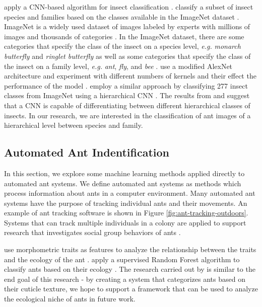 \documentclass[12pt]{article}
\begin{document}
\citeauthor*{lim_performance_2017} apply a CNN-based algorithm for insect
classification \cite{lim_performance_2017}. \citeauthor*{lim_performance_2017}
classify a subset of insect species and families based on the classes available
in the ImageNet dataset \cite{deng_imagenet_2009}. ImageNet is a widely used
dataset of images labeled by experts with millions of images and thousands of
categories \cite{deng_imagenet_2009}. In the ImageNet dataset, there are some
categories that specify the class of the insect on a species level,
\textit{e.g.} \textit{monarch butterfly} and \textit{ringlet butterfly} as well
as some categories that specify the class of the insect on a family level,
\textit{e.g.} \textit{ant}, \textit{fly}, and \textit{bee}
\cite{imagenet_labels}. \citeauthor*{lim_performance_2017} use a modified
AlexNet architecture and experiment with different numbers of kernels and their
effect the performance of the model \cite{lim_performance_2017}.
\citeauthor*{glick_insect_2016} employ a similar approach by classifying 277
insect classes from ImageNet using a hierarchical CNN \cite{glick_insect_2016}.
The results from \citeauthor*{lim_performance_2017} and
\citeauthor*{glick_insect_2016} suggest that a CNN is capable of differentiating
between different hierarchical classes of insects. In our research, we are
interested in the classification of ant images of a hierarchical level between
species and family.

\subsection{Automated Ant Indentification}

In this section, we explore some machine learning methods applied directly to
automated ant systems. We define automated ant systems as methods which process
information about ants in a computer environment. Many automated ant systems
have the purpose of tracking individual ants and their movements. An example of
ant tracking software is shown in Figure \ref{fig:ant-tracking-outdoors}.
Systems that can track multiple individuals in a colony are applied to support
research that investigates social group behaviors of ants
\cite{chandra_foraging_2021, fetter_oxytocin_2021, sclocco_integrating_2020}.

\citeauthor*{sosiak_multidimensional_2021} use morphometric traits as features to
analyze the relationship between the traits and the ecology of the ant
\cite{sosiak_multidimensional_2021}. \citeauthor*{sosiak_multidimensional_2021}
apply a supervised Random Forest algorithm to classify ants based on their
ecology \cite{sosiak_multidimensional_2021}. The research carried out by
\citeauthor*{sosiak_multidimensional_2021} is similar to the end goal of this
research - by creating a system that categorizes ants based on their cuticle
texture, we hope to support a framework that can be used to analyze the
ecological niche of ants in future work.
\end{document}
